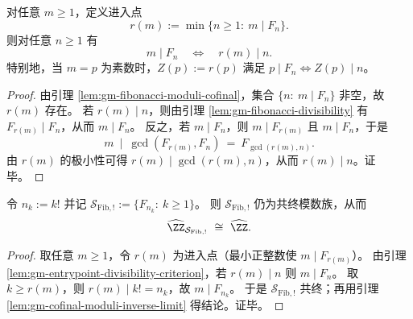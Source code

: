 \begin{lemma}[进入点的整除判据]\label{lem:gm-entrypoint-divisibility-criterion}
对任意 \(m\ge 1\)，定义进入点
\[
r(m):=\min\{n\ge 1:\ m\mid F_n\}.
\]
则对任意 \(n\ge 1\) 有
\[
m\mid F_n\quad\Longleftrightarrow\quad r(m)\mid n.
\]
特别地，当 \(m=p\) 为素数时，\(Z(p):=r(p)\) 满足 \(p\mid F_n\iff Z(p)\mid n\)。
\end{lemma}
\begin{proof}
由引理 \ref{lem:gm-fibonacci-moduli-cofinal}，集合 \(\{n:\ m\mid F_n\}\) 非空，故 \(r(m)\) 存在。
若 \(r(m)\mid n\)，则由引理 \ref{lem:gm-fibonacci-divisibility} 有 \(F_{r(m)}\mid F_n\)，从而 \(m\mid F_n\)。
反之，若 \(m\mid F_n\)，则 \(m\mid F_{r(m)}\) 且 \(m\mid F_n\)，于是
\[
m\ \mid\ \gcd(F_{r(m)},F_n)\ =\ F_{\gcd(r(m),n)}.
\]
由 \(r(m)\) 的极小性可得 \(r(m)\mid \gcd(r(m),n)\)，从而 \(r(m)\mid n\)。证毕。
\end{proof}

\begin{corollary}\label{cor:gm-fibonacci-factorial-sparse-axis}
令 \(n_k:=k!\) 并记 \(\mathcal{S}_{\mathrm{Fib},!}:=\{F_{n_k}:\ k\ge 1\}\)。
则 \(\mathcal{S}_{\mathrm{Fib},!}\) 仍为共终模数族，从而
\[
\widehat{\ZZ}_{\mathcal{S}_{\mathrm{Fib},!}}\ \cong\ \widehat{\ZZ}.
\]
\end{corollary}
\begin{proof}
取任意 \(m\ge 1\)，令 \(r(m)\) 为进入点（最小正整数使 \(m\mid F_{r(m)}\)）。
由引理 \ref{lem:gm-entrypoint-divisibility-criterion}，若 \(r(m)\mid n\) 则 \(m\mid F_n\)。
取 \(k\ge r(m)\)，则 \(r(m)\mid k!=n_k\)，故 \(m\mid F_{n_k}\)。
于是 \(\mathcal{S}_{\mathrm{Fib},!}\) 共终；再用引理 \ref{lem:gm-cofinal-moduli-inverse-limit} 得结论。证毕。
\end{proof}

